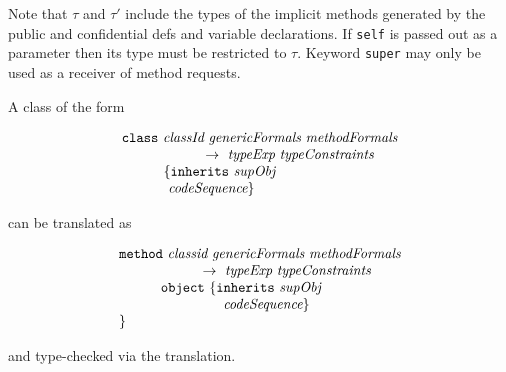 Note that $\tau$ and $\tau'$ include the types of the implicit methods
generated by the public and confidential defs and variable 
declarations.  If \texttt{self} is passed out as a parameter then its 
type must be restricted to $\tau$.  Keyword \texttt{super} may only 
be used as a receiver of method requests.

A class of the form

$$\begin{array}{l}\texttt{class}\ \emph{classId}\  \emph{genericFormals}\  
\emph{methodFormals}\\ 
\hspace*{6em} \ra \ \emph{typeExp}\ \emph{typeConstraints} \\
\hspace*{3em} \{  \texttt{inherits}\ \emph{supObj} \\
\hspace*{3em}\ \emph{codeSequence}\}
\end{array}$$

can be translated as

$$\begin{array}{l}\texttt{method}\ \emph{classid} \  \emph{genericFormals}\  
\emph{methodFormals}\\ 
\hspace*{6em} \ra \ \emph{typeExp}\ \emph{typeConstraints} \\
\hspace*{3em} \texttt{object}\ \{  \texttt{inherits}\ \emph{supObj} \\
\hspace*{6.8em}\ \emph{ codeSequence} \}\\
\}
\end{array}$$

and type-checked via the translation.



